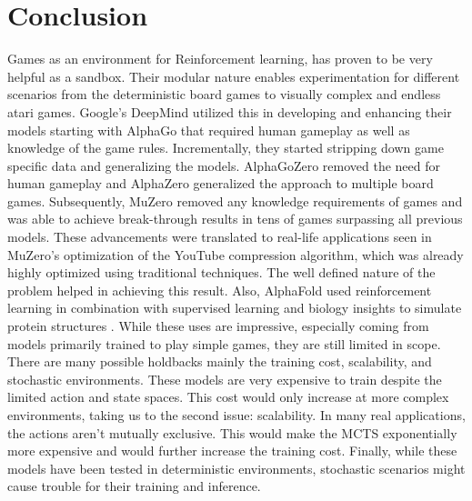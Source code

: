 \section*{Conclusion}

Games as an environment for Reinforcement learning, has proven to be very helpful as a sandbox. Their modular nature enables experimentation for different scenarios from the deterministic board games to visually complex and endless atari games. Google’s DeepMind utilized this in developing and enhancing their models starting with AlphaGo that required human gameplay as well as knowledge of the game rules. Incrementally, they started stripping down game specific data and generalizing the models. AlphaGoZero removed the need for human gameplay and AlphaZero generalized the approach to multiple board games. Subsequently, MuZero removed any knowledge requirements of games and was able to achieve break-through results in tens of games surpassing all previous models. These advancements were translated to real-life applications seen in MuZero’s optimization of the YouTube compression algorithm, which was already highly optimized using traditional techniques. The well defined nature of the problem helped in achieving this result. Also, AlphaFold used reinforcement learning in combination with supervised learning and biology insights to simulate protein structures . While these uses are impressive, especially coming from models primarily trained to play simple games, they are still limited in scope. There are many possible holdbacks mainly the training cost, scalability, and stochastic environments. These models are very expensive to train despite the limited action and state spaces. This cost would only increase at more complex environments, taking us to the second issue: scalability. In many real applications, the actions aren’t mutually exclusive. This would make the MCTS exponentially more expensive and would further increase the training cost. Finally, while these models have been tested in deterministic environments, stochastic scenarios might cause trouble for their training and inference.
